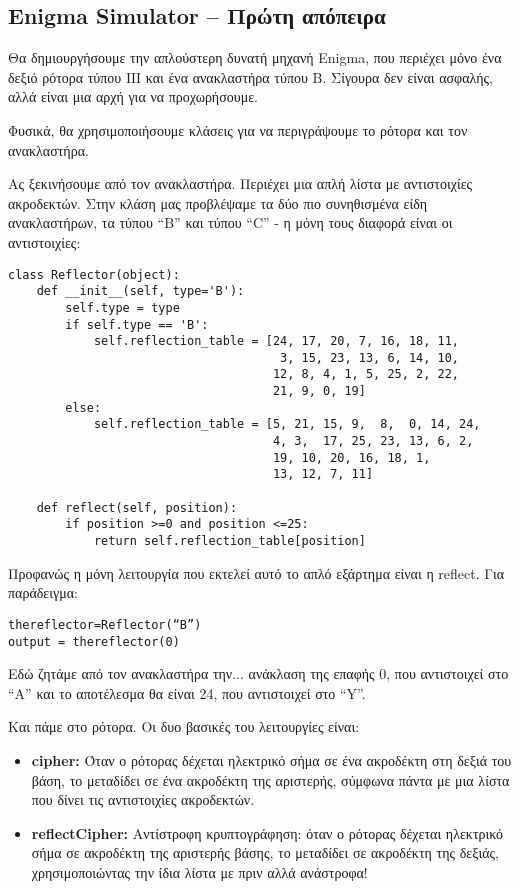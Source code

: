 \documentclass[a4paper,twoside,12pt]{article}
\begin{document}
\subsection{Enigma Simulator – Πρώτη απόπειρα}

Θα δημιουργήσουμε την απλούστερη δυνατή μηχανή Enigma, που  περιέχει μόνο ένα δεξιό ρότορα τύπου ΙΙΙ και ένα ανακλαστήρα τύπου Β. Σίγουρα δεν είναι ασφαλής, αλλά είναι μια αρχή για να προχωρήσουμε.

Φυσικά, θα χρησιμοποιήσουμε κλάσεις για να περιγράψουμε το ρότορα και τον ανακλαστήρα.

Ας ξεκινήσουμε από τον ανακλαστήρα. Περιέχει μια απλή λίστα με αντιστοιχίες ακροδεκτών. Στην κλάση μας προβλέψαμε τα δύο πιο συνηθισμένα είδη ανακλαστήρων, τα τύπου “Β” και τύπου “C” - η μόνη τους διαφορά είναι οι αντιστοιχίες:

\begin{verbatim}
class Reflector(object):
    def __init__(self, type='B'):
        self.type = type
        if self.type == 'B':
            self.reflection_table = [24, 17, 20, 7, 16, 18, 11,
                                      3, 15, 23, 13, 6, 14, 10,
                                     12, 8, 4, 1, 5, 25, 2, 22,
                                     21, 9, 0, 19]
        else:
            self.reflection_table = [5, 21, 15, 9,  8,  0, 14, 24,
                                     4, 3,  17, 25, 23, 13, 6, 2,
                                     19, 10, 20, 16, 18, 1,
                                     13, 12, 7, 11] 
                
    def reflect(self, position):
        if position >=0 and position <=25:
            return self.reflection_table[position]

\end{verbatim}

Προφανώς η μόνη λειτουργία που εκτελεί αυτό το απλό εξάρτημα είναι η reflect. Για παράδειγμα:

\begin{verbatim}
thereflector=Reflector(“B”)
output = thereflector(0)
\end{verbatim}

Εδώ ζητάμε από τον ανακλαστήρα την... ανάκλαση της επαφής 0, που αντιστοιχεί στο “Α” και το αποτέλεσμα θα είναι 24, που αντιστοιχεί στο “Y”.

Και πάμε στο ρότορα. Οι δυο βασικές του λειτουργίες είναι:

\begin{itemize}
\item \textbf{cipher:} Όταν ο ρότορας δέχεται ηλεκτρικό σήμα σε ένα ακροδέκτη στη δεξιά του βάση, το μεταδίδει σε ένα ακροδέκτη της αριστερής, σύμφωνα πάντα με μια λίστα που δίνει τις αντιστοιχίες ακροδεκτών.

\item \textbf{reflectCipher:} Αντίστροφη κρυπτογράφηση: όταν ο ρότορας δέχεται ηλεκτρικό σήμα σε ακροδέκτη της αριστερής βάσης, το μεταδίδει σε ακροδέκτη της δεξιάς, χρησιμοποιώντας την ίδια λίστα με πριν αλλά ανάστροφα!
\end{itemize}
\end{document}
